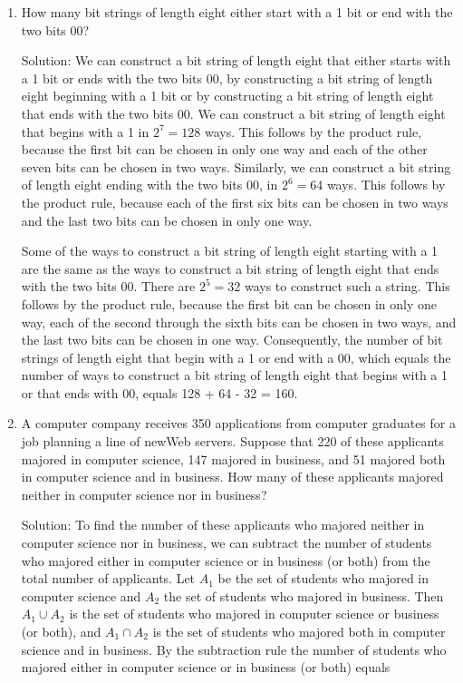 \documentclass[11pt,a4paper]{book}
\begin{document}
\begin{enumerate}[label=Example~\arabic*]
\item How many bit strings of length eight either start with a 1 bit or end with the two bits 00?

Solution: We can construct a bit string of length eight that either starts with a 1 bit or ends with the two bits 00, by constructing a bit string of length eight beginning with a 1 bit or by constructing a bit string of length eight that ends with the two bits 00.
We can construct a bit string of length eight that begins with a 1 in $2^{7} = 128$ ways.
This follows by the product rule, because the first bit can be chosen in only one way and each of the other seven bits can be chosen in two ways.
Similarly, we can construct a bit string of length eight ending with the two bits 00, in $2^{6} = 64$ ways.
This follows by the product rule, because each of the first six bits can be chosen in two ways and the last two bits can be chosen in only one way.

Some of the ways to construct a bit string of length eight starting with a 1 are the same as the ways to construct a bit string of length eight that ends with the two bits 00.
There are $2^{5} = 32$ ways to construct such a string.
This follows by the product rule, because the first bit can be chosen in only one way, each of the second through the sixth bits can be chosen in two ways, and the last two bits can be chosen in one way.
Consequently, the number of bit strings of length eight that begin with a 1 or end with a 00, which equals the number of ways to construct a bit string of length eight that begins with a 1 or that ends with 00, equals 128 + 64 - 32 = 160.

\item A computer company receives 350 applications from computer graduates for a job planning a line of newWeb servers.
Suppose that 220 of these applicants majored in computer science, 147 majored in business, and 51 majored both in computer science and in business.
How many of these applicants majored neither in computer science nor in business?

Solution: To find the number of these applicants who majored neither in computer science nor in business, we can subtract the number of students who majored either in computer science or in business (or both) from the total number of applicants.
Let $A_1$ be the set of students who majored in computer science and $A_2$ the set of students who majored in business.
Then $A_1 \cup A_2$ is the set of students who majored in computer science or business (or both), and $A_1 \cap A_2$ is the set of students who majored both in computer science and in business.
By the subtraction rule the number of students who majored either in computer science or in business (or both) equals


\end{enumerate}
\end{document}
